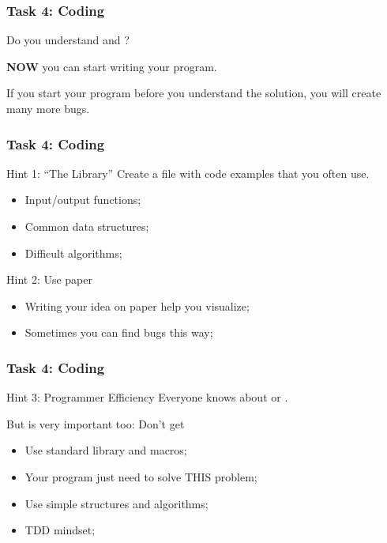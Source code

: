 \documentclass{beamer}
\begin{document}
\begin{frame}
  \frametitle{Task 4: Coding}

  Do you understand  and ?

  \bigskip

  {\bf NOW} you can start writing your program.

  \vfill

  \begin{block}{}
    If you start your program before you understand the solution, you
    will create many more bugs.
  \end{block}
\end{frame}

\begin{frame}
  \frametitle{Task 4: Coding}
  \begin{exampleblock}{Hint 1: ``The Library''}
    Create a file with code examples that you often use.
    \begin{itemize}
    \item Input/output functions;
    \item Common data structures;
    \item Difficult algorithms;
    \end{itemize}
   \end{exampleblock}

   \begin{block}{Hint 2: Use paper}
    \begin{itemize}
    \item Writing your idea on paper help you visualize;
    \item Sometimes you can find bugs this way;
    \end{itemize}
  \end{block}
\end{frame}

\begin{frame}
  \frametitle{Task 4: Coding}

  \begin{block}{Hint 3: Programmer Efficiency}
    Everyone knows about  or
    .

    \bigskip

    But  is very important too: Don't
    get 
  \end{block}

  \vfill

  \begin{itemize}
  \item Use standard library and macros;
  \item Your program just need to solve THIS problem;
  \item Use simple structures and algorithms;
  \item TDD mindset;
  \end{itemize}
\end{frame}
\end{document}
